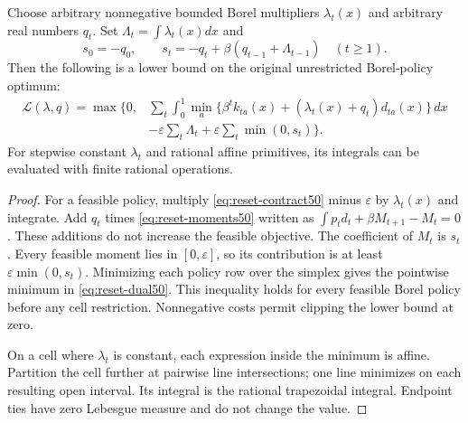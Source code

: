 \begin{proposition}\label{prop:reset-dual50}
Choose arbitrary nonnegative bounded Borel multipliers $\lambda_t(x)$ and arbitrary real numbers $q_t$. Set $\Lambda_t=\int\lambda_t(x)dx$ and
\[
 s_0=-q_0,\qquad s_t=-q_t+\beta(q_{t-1}+\Lambda_{t-1})\quad (t\ge1).
\]
Then the following is a lower bound on the original unrestricted Borel-policy optimum:
\begin{equation}\label{eq:reset-dual50}
 \begin{split}\mathcal L(\lambda,q)=\max\bigg\{0,
 &\sum_t\int_0^1\min_a\{\beta^tk_{ta}(x)+(\lambda_t(x)+q_t)d_{ta}(x)\}\,dx\\
 &-\varepsilon\sum_t\Lambda_t+\varepsilon\sum_t\min(0,s_t)\bigg\}.\end{split}
\end{equation}
For stepwise constant $\lambda_t$ and rational affine primitives, its integrals can be evaluated with finite rational operations.
\end{proposition}
\begin{proof}
For a feasible policy, multiply \eqref{eq:reset-contract50} minus $\varepsilon$ by $\lambda_t(x)$ and integrate. Add $q_t$ times \eqref{eq:reset-moments50} written as $\int p_td_t+\beta M_{t+1}-M_t=0$. These additions do not increase the feasible objective. The coefficient of $M_t$ is $s_t$. Every feasible moment lies in $[0,\varepsilon]$, so its contribution is at least $\varepsilon\min(0,s_t)$. Minimizing each policy row over the simplex gives the pointwise minimum in \eqref{eq:reset-dual50}. This inequality holds for every feasible Borel policy before any cell restriction. Nonnegative costs permit clipping the lower bound at zero.

On a cell where $\lambda_t$ is constant, each expression inside the minimum is affine. Partition the cell further at pairwise line intersections; one line minimizes on each resulting open interval. Its integral is the rational trapezoidal integral. Endpoint ties have zero Lebesgue measure and do not change the value.\end{proof}

